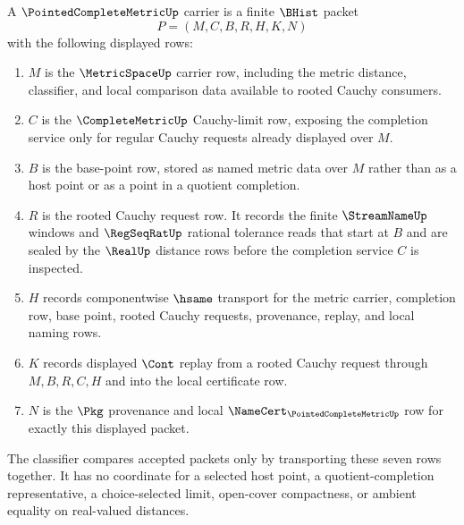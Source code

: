 \begin{definition}
\label{def:pointed-complete-metric-carrier}
A $\PointedCompleteMetricUp$ carrier is a finite $\BHist$ packet
$$
P=(M,C,B,R,H,K,N)
$$
with the following displayed rows:
\begin{enumerate}
\item $M$ is the $\MetricSpaceUp$ carrier row, including the metric distance,
classifier, and local comparison data available to rooted Cauchy consumers.
\item $C$ is the $\CompleteMetricUp$ Cauchy-limit row, exposing the
completion service only for regular Cauchy requests already displayed over
$M$.
\item $B$ is the base-point row, stored as named metric data over $M$ rather
than as a host point or as a point in a quotient completion.
\item $R$ is the rooted Cauchy request row. It records the finite
$\StreamNameUp$ windows and $\RegSeqRatUp$ rational tolerance reads that start
at $B$ and are sealed by the $\RealUp$ distance rows before the completion
service $C$ is inspected.
\item $H$ records componentwise $\hsame$ transport for the metric carrier,
completion row, base point, rooted Cauchy requests, provenance, replay, and
local naming rows.
\item $K$ records displayed $\Cont$ replay from a rooted Cauchy request
through $M,B,R,C,H$ and into the local certificate row.
\item $N$ is the $\Pkg$ provenance and local
$\NameCert_{\PointedCompleteMetricUp}$ row for exactly this displayed packet.
\end{enumerate}
The classifier compares accepted packets only by transporting these seven rows
together. It has no coordinate for a selected host point, a quotient-completion
representative, a choice-selected limit, open-cover compactness, or ambient
equality on real-valued distances.
\end{definition}

